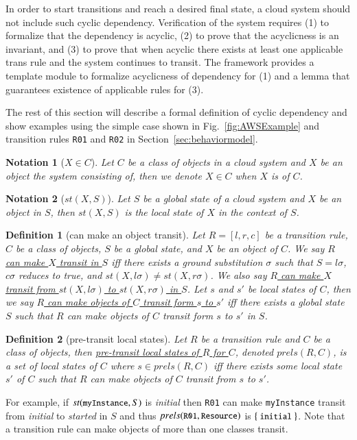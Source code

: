 \documentclass[12pt]{report}
\newtheorem{notation}{Notation}
\newtheorem{definition}{Definition}
\newcommand{\mbstt}[1]{\mbox{\small{\tt {#1}}}}
\newcommand{\stt}[1]{{\small{\tt {#1}}}}
\newcommand{\ul}{\underline}
\begin{document}
In order to start transitions and reach a desired final state, a cloud
system should not include such cyclic dependency. Verification of the
system requires (1) to formalize that the dependency is acyclic, (2)
to prove that the acyclicness is an invariant, and (3) to prove that
when acyclic there exists at least one applicable trans rule and the
system continues to transit. The framework provides a template module
to formalize acyclicness of dependency for (1) and a lemma that
guarantees existence of applicable rules for (3).

The rest of this section will describe a formal definition of cyclic
dependency and show examples using the simple case shown in
Fig.~\ref{fig:AWSExample} and transition rules {\tt R01} and {\tt R02}
in Section~\ref{sec:behaviormodel}.

\begin{notation}[$X \in C$]
Let $C$ be a class of objects in a cloud system and $X$ be an object
the system consisting of, then we denote \ul{$X \in C$} when $X$ is of
$C$.
\end{notation}

\begin{notation}[$st(X,S)$]
Let $S$ be a global state of a cloud system and $X$ be an object in
$S$, then \ul{$st(X,S)$} is the local state of $X$ in the context of
$S$.
\end{notation}

\begin{definition}[can make an object transit]
Let $R = [l,r,c]$ be a transition rule, $C$ be a class of objects, $S$
be a global state, and $X$ be an object of $C$. We say \ul{$R$ can
  make $X$ transit in $S$} iff there exists a ground substitution
$\sigma$ such that $S = l\sigma$, $c\sigma$ reduces to true, and
$st(X,l\sigma) \ne st(X,r\sigma)$. We also say \ul{$R$ can make $X$
  transit from $st(X,l\sigma)$ to $st(X,r\sigma)$ in $S$}.  Let $s$
and $s'$ be local states of $C$, then we say \ul{$R$ can make objects
  of $C$ transit form $s$ to $s'$} iff there exists a global state $S$
such that $R$ can make objects of $C$ transit form $s$ to $s'$ in $S$.
\end{definition}

\begin{definition}[pre-transit local states]
Let $R$ be a transition rule and $C$ be a class of objects, then
\ul{pre-transit local states of $R$ for $C$}, denoted
\ul{$prels(R,C)$}, is a set of local states of $C$ where $s \in
prels(R,C)$ iff there exists some local state $s'$ of $C$ such that
$R$ can make objects of $C$ transit from $s$ to $s'$.
\end{definition}
For example, if $st(\mbstt{myInstance},S)$ is {\it initial} then
\stt{R01} can make \stt{myInstance} transit from {\it initial} to {\it
  started} in $S$ and thus $prels(\mbstt{R01},\mbstt{Resource})$ is
$\{~\mbstt{initial}~\}$. Note that a transition rule can make objects
of more than one classes transit.
\end{document}
